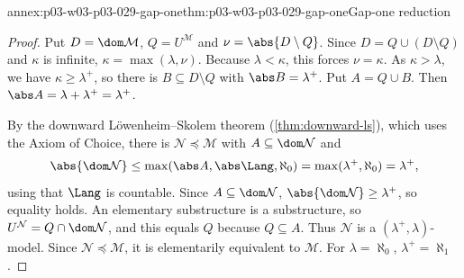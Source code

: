 \begin{annexitem}{annex:p03-w03-p03-029-gap-one}{thm:p03-w03-p03-029-gap-one}{Gap-one reduction}
\begin{proof}
Put \(D=\dom\mathcal M\), \(Q=U^{\mathcal M}\) and \(\nu=\abs{D\setminus
Q}\). Since \(D=Q\cup(D\setminus Q)\) and \(\kappa\) is infinite,
\(\kappa=\max(\lambda,\nu)\). Because \(\lambda<\kappa\), this forces
\(\nu=\kappa\). As \(\kappa>\lambda\), we have \(\kappa\geq\lambda^+\), so
there is \(B\subseteq D\setminus Q\) with \(\abs B=\lambda^+\). Put
\(A=Q\cup B\). Then \(\abs A=\lambda+\lambda^+=\lambda^+\).

By the downward L\"owenheim--Skolem theorem (\cref{thm:downward-ls}), which
uses the Axiom of Choice, there is \(\mathcal N\preccurlyeq\mathcal M\) with
\(A\subseteq\dom\mathcal N\) and
\[
  \abs{\dom\mathcal N}\leq\max(\abs A,\abs\Lang,\aleph_0)
  =\max(\lambda^+,\aleph_0)=\lambda^+,
\]
using that \(\Lang\) is countable. Since \(A\subseteq\dom\mathcal N\),
\(\abs{\dom\mathcal N}\geq\lambda^+\), so equality holds. An elementary
substructure is a substructure, so \(U^{\mathcal N}=Q\cap\dom\mathcal N\),
and this equals \(Q\) because \(Q\subseteq A\). Thus \(\mathcal N\) is a
\((\lambda^+,\lambda)\)-model. Since \(\mathcal N\preccurlyeq\mathcal M\),
it is elementarily equivalent to \(\mathcal M\). For \(\lambda=\aleph_0\),
\(\lambda^+=\aleph_1\).
\end{proof}
\end{annexitem}


